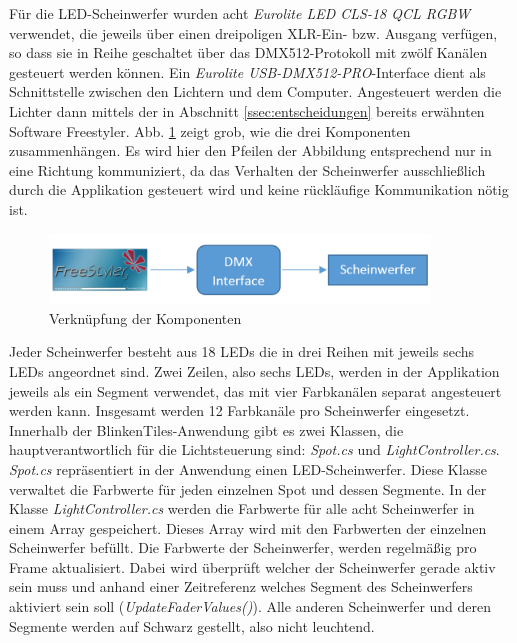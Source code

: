 \label{ssec:DMX}

Für die LED-Scheinwerfer wurden acht \emph{Eurolite LED CLS-18 QCL RGBW} verwendet, die jeweils über einen dreipoligen XLR-Ein- bzw. Ausgang verfügen, so dass sie in Reihe geschaltet über das DMX512-Protokoll mit zwölf Kanälen gesteuert werden können. Ein \emph{Eurolite USB-DMX512-PRO}-Interface dient als Schnittstelle zwischen den Lichtern und dem Computer. Angesteuert werden die Lichter dann mittels der in Abschnitt \ref{ssec:entscheidungen} bereits erwähnten Software Freestyler. Abb. \ref{fig:FStoLED} zeigt grob, wie die drei Komponenten zusammenhängen. Es wird hier den Pfeilen der Abbildung entsprechend nur in eine Richtung kommuniziert, da das Verhalten der Scheinwerfer ausschließlich durch die Applikation gesteuert wird und keine rückläufige Kommunikation nötig ist.

\begin{figure}[htbp]
	\centering
		\includegraphics[width=0.90\textwidth]{images/FStoDMXInterfaceToLEDs.PNG}
	\caption{Verknüpfung der Komponenten}
	\label{fig:FStoLED}
\end{figure}

Jeder Scheinwerfer besteht aus 18 LEDs die in drei Reihen mit jeweils sechs LEDs angeordnet sind. Zwei Zeilen, also sechs LEDs, werden in der Applikation jeweils als ein Segment verwendet, das mit vier Farbkanälen separat angesteuert werden kann. Insgesamt werden 12 Farbkanäle pro Scheinwerfer eingesetzt. Innerhalb der BlinkenTiles-Anwendung gibt es zwei Klassen, die hauptverantwortlich für die Lichtsteuerung sind: \emph{Spot.cs} und \emph{LightController.cs}. \emph{Spot.cs} repräsentiert in der Anwendung einen LED-Scheinwerfer. Diese Klasse verwaltet die Farbwerte für jeden einzelnen Spot und dessen Segmente. In der Klasse \emph{LightController.cs} werden die Farbwerte für alle acht Scheinwerfer in einem Array gespeichert. Dieses Array wird mit den Farbwerten der einzelnen Scheinwerfer befüllt. Die Farbwerte der Scheinwerfer, werden regelmäßig pro Frame aktualisiert. Dabei wird überprüft welcher der Scheinwerfer gerade aktiv sein muss und anhand einer Zeitreferenz welches Segment des Scheinwerfers aktiviert sein soll (\emph{UpdateFaderValues()}). Alle anderen Scheinwerfer und deren Segmente werden auf Schwarz gestellt, also nicht leuchtend. 

